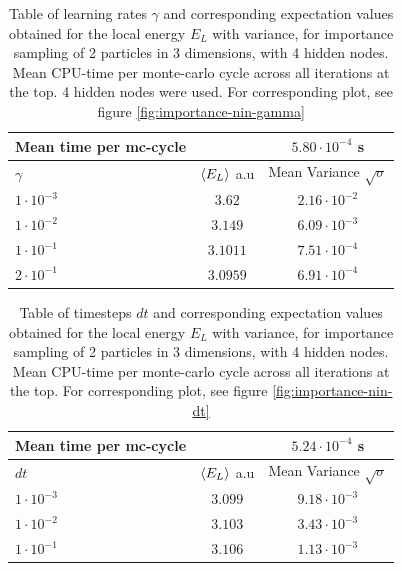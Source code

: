 \begin{table}[h]
\begin{tabular}{l c c}
	Mean time per mc-cycle & &$5.80\cdot10^{-4}$ s \\
	\hline
	$\gamma$ & $\langle E_L \rangle$ a.u & Mean Variance $\sqrt{\sigma}$\\
	\hline
	$1\cdot10^{-3}$ & $3.62$ & $2.16\cdot10^{-2}$ \\
	$1\cdot10^{-2}$ & $3.149$ & $6.09\cdot10^{-3}$ \\
	$1\cdot10^{-1}$ & $3.1011$ & $7.51\cdot10^{-4}$ \\
	$2\cdot10^{-1}$ & $3.0959$ & $6.91\cdot10^{-4}$ \\
\end{tabular}
\label{tab:importance-nin-gamma}
\caption{Table of learning rates $\gamma$ and corresponding expectation values obtained for the local energy $E_L$ with variance, for importance sampling
		of 2 particles in 3 dimensions, with 4 hidden nodes.
		Mean CPU-time per monte-carlo cycle across all iterations at the top. 4 hidden nodes were used.
	For corresponding plot, see figure \ref{fig:importance-nin-gamma}}
\end{table}

\begin{table}[h]
\begin{tabular}{l c c}
	Mean time per mc-cycle & & $5.24\cdot10^{-4}$ s \\
	\hline
	$dt$ & $\langle E_L \rangle$ a.u & Mean Variance $\sqrt{\sigma}$\\
	\hline
	$1\cdot10^{-3}$ & $3.099$ & $9.18\cdot10^{-3}$ \\
	$1\cdot10^{-2}$ & $3.103$ & $3.43\cdot10^{-3}$ \\
	$1\cdot10^{-1}$ & $3.106$ & $1.13\cdot10^{-3}$ \\
\end{tabular}
\label{tab:importance-nin-dt}
\caption{Table of timesteps $dt$ and corresponding expectation values obtained for the local energy $E_L$ with variance, for importance sampling
		of 2 particles in 3 dimensions, with 4 hidden nodes.
		Mean CPU-time per monte-carlo cycle across all iterations at the top.
	For corresponding plot, see figure \ref{fig:importance-nin-dt}}
\end{table}


